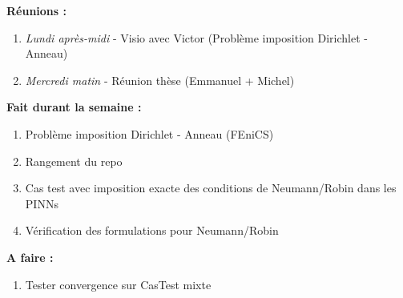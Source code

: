 \textbf{Réunions :}
\begin{enumerate}[label=\textbullet]
	\item \textit{Lundi après-midi} - Visio avec Victor (Problème imposition Dirichlet - Anneau)
	\item \textit{Mercredi matin} - Réunion thèse (Emmanuel + Michel)
\end{enumerate}
\textbf{Fait durant la semaine :}
\begin{enumerate}[label=\textbullet]
	\item Problème imposition Dirichlet - Anneau (FEniCS)
	\item Rangement du repo
	\item Cas test avec imposition exacte des conditions de Neumann/Robin dans les PINNs
	\item Vérification des formulations pour Neumann/Robin
\end{enumerate}
\textbf{A faire :}
\begin{enumerate}[label=\textbullet]
	\item Tester convergence sur CasTest mixte
\end{enumerate}